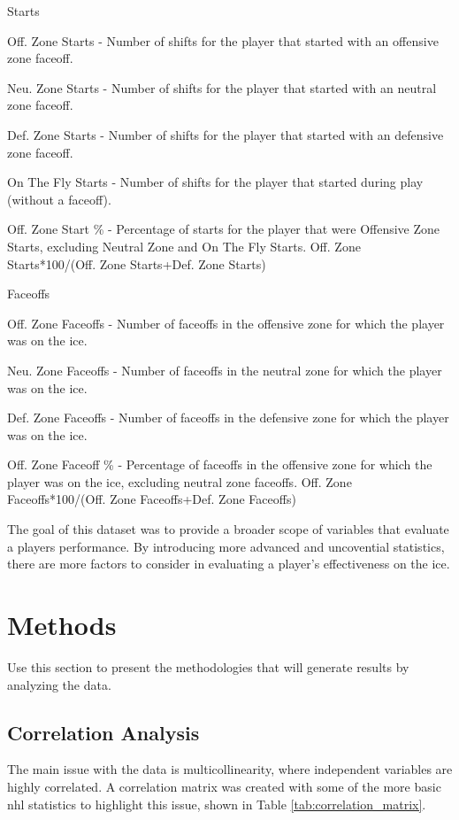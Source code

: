 \documentclass[12pt]{article}
\begin{document}
Starts

Off. Zone Starts - Number of shifts for the player that started with an offensive zone faceoff.

Neu. Zone Starts - Number of shifts for the player that started with an neutral zone faceoff.

Def. Zone Starts - Number of shifts for the player that started with an defensive zone faceoff.

On The Fly Starts - Number of shifts for the player that started during play (without a faceoff).

Off. Zone Start \% - Percentage of starts for the player that were Offensive Zone Starts, excluding Neutral Zone and On The Fly Starts. Off. Zone Starts*100/(Off. Zone Starts+Def. Zone Starts)

Faceoffs

Off. Zone Faceoffs - Number of faceoffs in the offensive zone for which the player was on the ice.

Neu. Zone Faceoffs - Number of faceoffs in the neutral zone for which the player was on the ice.

Def. Zone Faceoffs - Number of faceoffs in the defensive zone for which the player was on the ice.

Off. Zone Faceoff \% - Percentage of faceoffs in the offensive zone for which the player was on the ice, excluding neutral zone faceoffs. Off. Zone Faceoffs*100/(Off. Zone Faceoffs+Def. Zone Faceoffs)

The goal of this dataset was to provide a broader scope of variables that evaluate a players performance. By introducing more
advanced and uncovential statistics, there are more factors to consider in evaluating a player's effectiveness on the ice.


\section{Methods}
\label{sec:meth}

Use this section to present the methodologies that will generate results by
analyzing the data. 

\subsection{Correlation Analysis}
The main issue with the data is multicollinearity, where independent variables are highly correlated. A correlation matrix was created 
with some of the more basic nhl statistics to highlight this issue, shown in Table \ref{tab:correlation_matrix}.
\end{document}
